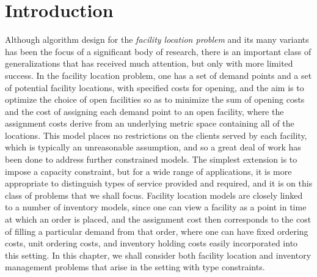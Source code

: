 \section{Introduction}

Although algorithm design for the {\it facility location problem} and its many variants has been the focus of a significant body of research, there is an important class of generalizations that has received much attention, but only with more limited success. In the facility location problem, one has a set of demand points and a set of potential facility locations, with specified costs for opening, and the aim is to optimize the choice of open facilities so as to minimize the sum of opening costs and the cost of assigning each demand point to an open facility, where the assignment costs derive from an underlying metric space containing all of the locations. This model places no restrictions on the clients served by each facility, which is typically an unreasonable assumption, and so a great deal of work has been done to address further constrained models. The simplest extension is to impose a capacity constraint, but for a wide range of applications, it is more appropriate to distinguish types of service provided and required, and it is on this class of problems that we shall focus. Facility location models are closely linked to a number of inventory models, since one can view a facility as a point in time at which an order is placed, and the assignment cost then corresponds to the cost of filling a particular demand from that order, where one can have fixed ordering costs, unit ordering costs, and inventory holding costs easily incorporated into this setting. In this chapter, we shall consider both facility location and inventory management problems that arise in the setting with type constraints. 

